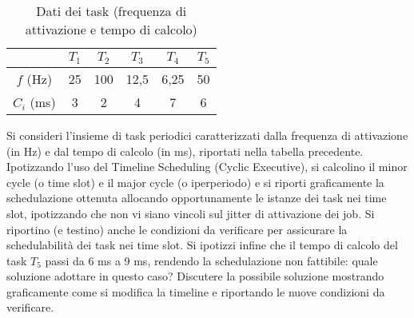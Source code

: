 \begin{Esercizio6}

\begin{table}[H]
\centering
\caption{Dati dei task (frequenza di attivazione e tempo di calcolo)}
\begin{tabular}{|c|c|c|c|c|c|}
\hline
 & $T_1$ & $T_2$ & $T_3$ & $T_4$ & $T_5$ \\
\hline
$f$ (Hz) & 25 & 100 & 12,5 & 6,25 & 50 \\
\hline
$C_i$ (ms) & 3 & 2 & 4 & 7 & 6 \\
\hline
\end{tabular}
\label{tab:timeline_tasks}
\end{table}

\noindent
Si consideri l'insieme di task periodici caratterizzati dalla frequenza di attivazione
(in Hz) e dal tempo di calcolo (in ms), riportati nella tabella precedente.
Ipotizzando l'uso del Timeline Scheduling (Cyclic Executive), si calcolino
il minor cycle (o time slot) e il major cycle (o iperperiodo) e si riporti
graficamente la schedulazione ottenuta allocando opportunamente le istanze
dei task nei time slot, ipotizzando che non vi siano vincoli sul jitter 
di attivazione dei job. Si riportino (e testino) anche le condizioni da 
verificare per assicurare la schedulabilità dei task nei time slot. Si ipotizzi
infine che il tempo di calcolo del task $T_5$ passi da 6 ms a 9 ms, rendendo la
schedulazione non fattibile: quale soluzione adottare in questo caso? Discutere
la possibile soluzione mostrando graficamente come si modifica la timeline e
riportando le nuove condizioni da verificare.


\end{Esercizio6}


